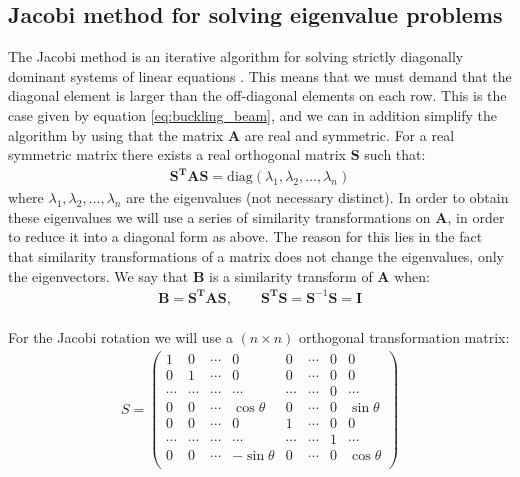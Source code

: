\documentclass[american,a4paper,12pt]{article}
\renewcommand{\vec}[1]{\mathbf{#1}} %
\begin{document}
\subsection{Jacobi method for solving eigenvalue problems}
The Jacobi method is an iterative algorithm for solving strictly diagonally dominant systems of linear equations \cite{wiki:jacobi}. This means that we must demand that the diagonal element is larger than the off-diagonal elements on each row. This is the case given by equation \ref{eq:buckling_beam}, and we can in addition simplify the algorithm by using that the matrix $\vec{A}$ are real and symmetric. For a real symmetric matrix there exists a real orthogonal matrix $\vec{S}$ such that:
\begin{align*}
    \vec{S^T}\vec{A}\vec{S} = \text{diag}(\lambda_1, \lambda_2, \hdots, \lambda_n)
\end{align*}
where $\lambda_1, \lambda_2, \hdots, \lambda_n$ are the eigenvalues (not necessary distinct). In order to obtain these eigenvalues we will use a series of similarity transformations on $\vec{A}$, in order to reduce it into a diagonal form as above. The reason for this lies in the fact that similarity transformations of a matrix does not change the eigenvalues, only the eigenvectors. We say that $\vec{B}$ is a similarity transform of $\vec{A}$ when:
\begin{align*}
    \vec{B} = \vec{S^T}\vec{A}\vec{S}, \qquad \vec{S^T}\vec{S} = \vec{S}^{-1}\vec{S} = \vec{I}
\end{align*}
\\
For the Jacobi rotation we will use a $(n \times n)$ orthogonal transformation matrix:
\begin{align*}
    S = 
    \begin{pmatrix}
        1 & 0 & \cdots & 0 & 0 & \cdots & 0 & 0 \\
        0 & 1 & \cdots & 0 & 0 & \cdots & 0 & 0 \\
        \cdots & \cdots & \cdots & \cdots & \cdots & \cdots & 0 & \cdots \\
        0 & 0 & \cdots & \cos{\theta} & 0 & \cdots & 0 & \sin{\theta} \\
        0 & 0 & \cdots & 0 & 1 & \cdots & 0 & 0 \\
        \cdots & \cdots & \cdots & \cdots & \cdots & \cdots & 1 & \cdots \\
         0 & 0 & \cdots & -\sin{\theta} & 0 & \cdots & 0 & \cos{\theta} \\
    \end{pmatrix}
\end{align*}
\end{document}
